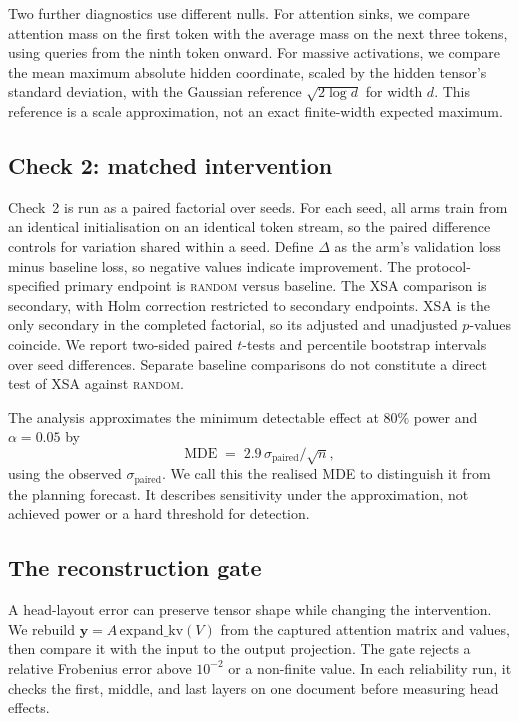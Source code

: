 \documentclass{article} %
\newcommand{\yv}{\mathbf{y}}
\begin{document}
\begin{samepage}
Two further diagnostics use different nulls. For attention sinks, we compare
attention mass on the first token with the average mass on the next three
tokens, using queries from the ninth token onward. For massive activations,
we compare the mean maximum absolute hidden coordinate, scaled by the hidden
tensor's standard deviation, with the Gaussian reference
$\sqrt{2\log d}$ for width $d$. This reference is a scale approximation,
not an exact finite-width expected maximum.
\end{samepage}

\subsection{Check 2: matched intervention}
\label{sec:check2}

Check~2 is run as a paired factorial over seeds. For each seed, all arms train
from an identical initialisation on an identical token stream, so the paired
difference controls for variation shared within a seed. Define $\Delta$ as
the arm's validation loss minus baseline loss, so negative values indicate
improvement. The protocol-specified primary endpoint is \textsc{random}
versus baseline. The XSA comparison is secondary, with Holm correction
\citep{holm1979simple} restricted to secondary endpoints. XSA is the only
secondary in the completed factorial, so its adjusted and unadjusted
$p$-values coincide. We report two-sided paired $t$-tests and percentile
bootstrap intervals over seed differences. Separate baseline comparisons
do not constitute a direct test of XSA against \textsc{random}.

The analysis approximates the minimum detectable effect at $80\%$ power and
$\alpha = 0.05$ by
\begin{equation}
\text{MDE} \;=\; 2.9\,\sigma_{\text{paired}} \big/ \sqrt{n},
\label{eq:mde}
\end{equation}
using the observed $\sigma_{\text{paired}}$. We call this the realised MDE
to distinguish it from the planning forecast. It describes sensitivity under
the approximation, not achieved power or a hard threshold for detection.

\subsection{The reconstruction gate}
\label{sec:gate}

A head-layout error can preserve tensor shape while changing the intervention.
We rebuild $\yv = A\,\mathrm{expand\_kv}(V)$ from the captured attention
matrix and values, then compare it with the input to the output projection.
The gate rejects a relative Frobenius error above $10^{-2}$ or a non-finite
value. In each reliability run, it checks the first, middle, and last layers
on one document before measuring head effects.
\end{document}
